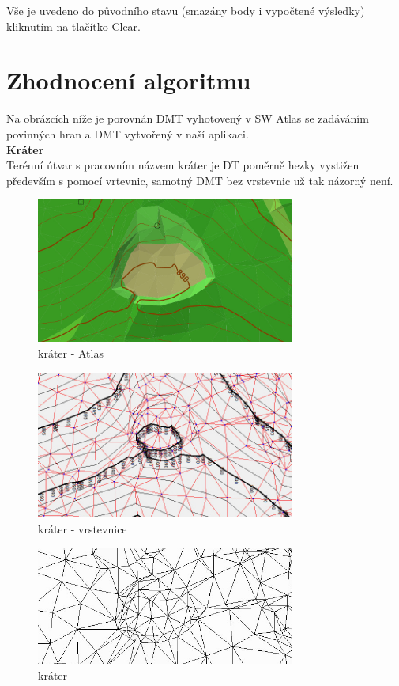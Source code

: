 \documentclass[a4paper, 12pt]{article}
\begin{document}
Vše je uvedeno do původního stavu (smazány body i vypočtené výsledky) kliknutím na tlačítko Clear.\\
\clearpage

\section{Zhodnocení algoritmu}

Na obrázcích níže je porovnán DMT vyhotovený v SW Atlas se zadáváním povinných hran a DMT vytvořený v naší aplikaci.\\


\textbf{Kráter}\\
Terénní útvar s pracovním názvem kráter je DT poměrně hezky vystižen především s pomocí vrtevnic, samotný DMT bez vrstevnic už tak názorný není.
 
\begin{figure}[h]
	\centering
	\includegraphics[width=8.5cm]{krater.jpg}
	\caption{kráter - Atlas}
\end{figure}

\begin{figure}[h]
	\centering
	\includegraphics[width=8.5cm]{krater_nas.jpg}
	\caption{kráter - vrstevnice}
\end{figure}

\begin{figure}[h]
	\centering
	\includegraphics[width=8.5cm]{krater_nas2.jpg}
	\caption{kráter}
\end{figure}
\clearpage
\end{document}
